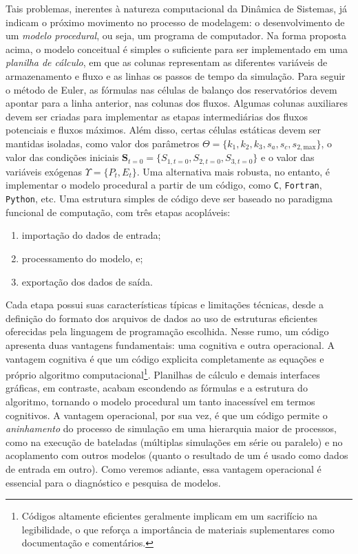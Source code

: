 \documentclass[./main.tex]{subfiles}
\begin{document}
\par Tais problemas, inerentes à natureza computacional da Dinâmica de Sistemas, já indicam o próximo movimento no processo de modelagem: o desenvolvimento de um \textit{modelo procedural}, ou seja, um programa de computador. Na forma proposta acima, o modelo conceitual é simples o suficiente para ser implementado em uma \textit{planilha de cálculo}, em que as colunas representam as diferentes variáveis de armazenamento e fluxo e as linhas os passos de tempo da simulação. Para seguir o método de Euler, as fórmulas nas células de balanço dos reservatórios devem apontar para a linha anterior, nas colunas dos fluxos. Algumas colunas auxiliares devem ser criadas para implementar as etapas intermediárias dos fluxos potenciais e fluxos máximos. Além disso, certas células estáticas devem ser mantidas isoladas, como valor dos parâmetros $\Theta = \{k_1, k_2, k_3, s_a, s_c, s_{2, \text{max}}\}$, o valor das condições iniciais $\textbf{S}_{t=0} = \{S_{1, t=0}, S_{2, t=0}, S_{3, t=0}\}$ e o valor das variáveis exógenas $\Upsilon = \{P_t, E_t\}$. Uma alternativa mais robusta, no entanto, é implementar o modelo procedural a partir de um código, como \texttt{C}, \texttt{Fortran}, \texttt{Python}, etc. Uma estrutura simples de código deve ser baseado no paradigma funcional de computação, com três etapas acopláveis: 
\begin{enumerate}
    \item importação do dados de entrada;
    \item processamento do modelo, e;
    \item exportação dos dados de saída.
\end{enumerate}
Cada etapa possui suas características típicas e limitações técnicas, desde a definição do formato dos arquivos de dados ao uso de estruturas eficientes oferecidas pela linguagem de programação escolhida. Nesse rumo, um código apresenta duas vantagens fundamentais: uma cognitiva e outra operacional. A vantagem cognitiva é que um código explicita completamente as equações e próprio algoritmo computacional\footnote{Códigos altamente eficientes geralmente implicam em um sacrifício na legibilidade, o que reforça a importância de materiais suplementares como documentação e comentários.}. Planilhas de cálculo e demais interfaces gráficas, em contraste, acabam escondendo as fórmulas e a estrutura do algoritmo, tornando o modelo procedural um tanto inacessível em termos cognitivos. A vantagem operacional, por sua vez, é que um código permite o \textit{aninhamento} do processo de simulação em uma hierarquia maior de processos, como na execução de bateladas (múltiplas simulações em série ou paralelo) e no acoplamento com outros modelos (quanto o resultado de um é usado como dados de entrada em outro). Como veremos adiante, essa vantagem operacional é essencial para o diagnóstico e pesquisa de modelos.
\end{document}
